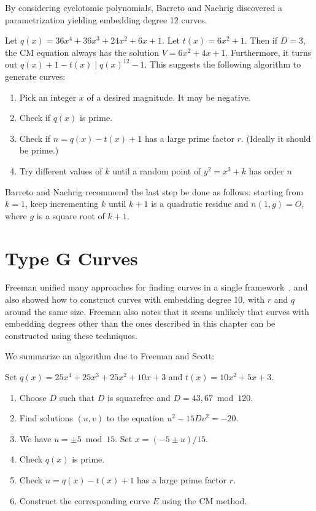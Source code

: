 By considering cyclotomic polynomials,
Barreto and Naehrig discovered a parametrization yielding embedding
degree 12 curves.

Let $q(x) = 36x^4 + 36x^3 + 24x^2 + 6x + 1$. Let $t(x) = 6x^2 + 1$.
Then if $D = 3$, the CM equation always has the solution
$V = 6x^2 + 4x + 1$. Furthermore,
it turns out $q(x) + 1 - t(x) \mid q(x)^{12} - 1$.
This suggests the following algorithm to generate curves:

\begin{enumerate}
\item
Pick an integer $x$ of a desired magnitude. It may be negative.
\item
Check if $q(x)$ is prime.
\item
Check if $n = q(x) - t(x) + 1$ has a large prime factor $r$.
(Ideally it should be prime.)
\item
Try different values of $k$ until a random point of
$y^2 = x^3 + k$ has order $n$
\end{enumerate}

Barreto and Naehrig recommend the last step be done as follows:
starting from $k = 1$, keep incrementing $k$ until $k+1$ is a quadratic
residue and $n(1,g) = O$, where $g$ is a square root of $k + 1$.

\section {Type G Curves}

Freeman unified many approaches for finding curves in a single
framework~\cite{freeman06}, and also showed how to construct curves with
embedding degree 10, with $r$ and $q$ around the same size.
Freeman also notes that it seems unlikely that curves
with embedding degrees other than the ones described in this chapter
can be constructed using these techniques.

We summarize an algorithm due to Freeman and Scott:

Set $q(x) = 25x^4 + 25x^3 + 25x^2 + 10x + 3$ and
$t(x) = 10x^2 + 5x + 3$.

\begin{enumerate}
\item
Choose $D$ such that $D$ is squarefree and $D = 43, 67 \bmod 120$.
\item
Find solutions $(u,v)$ to the equation $u^2 - 15 Dv^2 = -20$.
\item
We have $u = \pm 5 \bmod 15$.
Set $x = (-5 \pm u)/15$.
\item
Check $q(x)$ is prime.
\item
Check $n = q(x) - t(x) + 1$ has a large prime factor $r$.
\item
Construct the corresponding curve $E$ using the CM method.
\end{enumerate}

